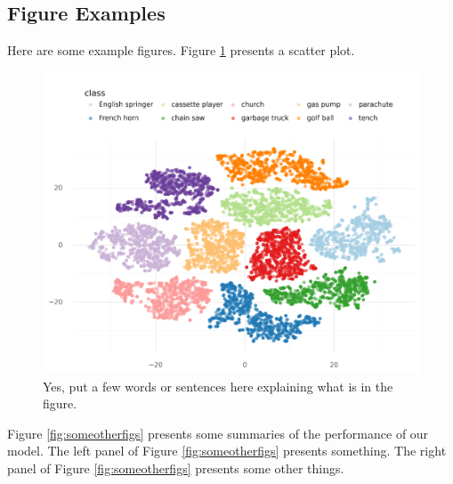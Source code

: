 \subsection{Figure Examples}

Here are some example figures. 
Figure \ref{fig:somefig1} presents a scatter plot.

\begin{figure}[htbp]
\centering
\includegraphics[width=.65\linewidth]{figure/somefig1.pdf}
\caption{Yes, put a few words or sentences here explaining what is in the figure.}
\label{fig:somefig1}
\end{figure}

Figure \ref{fig:someotherfigs} presents some summaries of the performance of our model.
The left panel of Figure \ref{fig:someotherfigs} presents something.
The right panel of Figure \ref{fig:someotherfigs} presents some other things.

